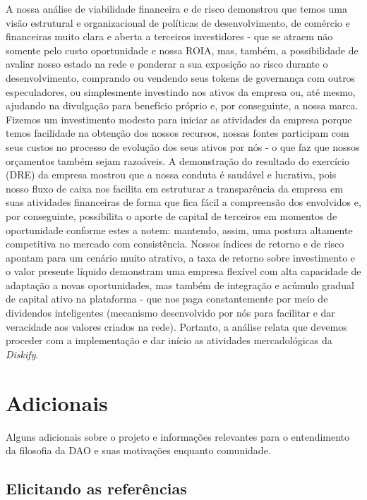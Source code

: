 \documentclass[onecolumn,12pt]{asme2ej}
\begin{document}
A nossa análise de viabilidade financeira e de risco demonstrou que temos uma visão estrutural e organizacional de políticas de desenvolvimento, de comércio e financeiras muito clara e aberta a terceiros investidores - que se atraem não somente pelo custo oportunidade e nossa ROIA, mas, também, a possibilidade de avaliar nosso estado na rede e ponderar a sua exposição ao risco durante o desenvolvimento, comprando ou vendendo seus tokens de governança com outros especuladores, ou simplesmente investindo nos ativos da empresa ou, até mesmo, ajudando na divulgação para benefício próprio e, por conseguinte, a nossa marca. Fizemos um investimento modesto para iniciar as atividades da empresa porque temos facilidade na obtenção dos nossos recursos, nossas fontes participam com seus custos no processo de evolução dos seus ativos por nós - o que faz que nossos orçamentos também sejam razoáveis. A demonstração do resultado do exercício (DRE) da empresa mostrou que a nossa conduta é saudável e lucrativa, pois nosso fluxo de caixa nos facilita em estruturar a transparência da empresa em suas atividades financeiras de forma que fica fácil a compreensão dos envolvidos e, por conseguinte, possibilita o aporte de capital de terceiros em momentos de oportunidade conforme estes a notem: mantendo, assim, uma postura altamente competitiva no mercado com consistência. Nossos índices de retorno e de risco apontam para um cenário muito atrativo, a taxa de retorno sobre investimento e o valor presente líquido demonstram uma empresa flexível com alta capacidade de adaptação a novas oportunidades, mas também de integração e acúmulo gradual de capital ativo na plataforma - que nos paga constantemente por meio de dividendos inteligentes (mecanismo desenvolvido por nós para facilitar e dar veracidade aos valores criados na rede). Portanto, a análise relata que devemos proceder com a implementação e dar início as atividades mercadológicas da {\it Diskify}.

\section{Adicionais}

Alguns adicionais sobre o projeto e informações relevantes para o entendimento da filosofia da DAO e suas motivações enquanto comunidade.

\subsection{Elicitando as referências}
\end{document}

